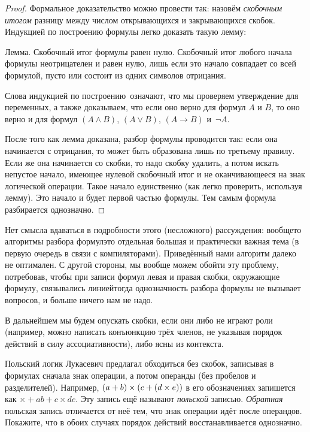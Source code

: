\begin{proof}
Формальное доказательство можно провести так: назовём
\emph{скобочным итогом}%
разницу между числом открывающихся
и закрывающихся скобок. Индукцией по построению формулы
легко доказать такую лемму:

\textsf{Лемма}. Скобочный итог формулы равен нулю.
Скобочный итог любого начала формулы неотрицателен и равен нулю,
лишь если это начало совпадает со всей формулой, пусто или
состоит из одних символов отрицания.

Слова  индукцией по построению\ означают, что мы
проверяем утверждение для переменных, а также
доказываем, что если оно верно для формул $A$ и $B$, то оно
верно и для формул $(A\land B)$, $(A\lor B)$, $(A\to B)$
и~$\lnot A$.

После того как лемма доказана, разбор формулы проводится так:
если она начинается с отрицания, то может быть образована лишь
по третьему правилу. Если же она начинается со скобки, то надо
скобку удалить, а потом искать непустое начало, имеющее нулевой
скобочный итог и не оканчивающееся на знак логической операции.
Такое начало единственно (как легко проверить, используя лемму).
Это начало и будет первой частью формулы. Тем самым формула
разбирается однозначно.
\end{proof}

Нет смысла вдаваться в подробности этого (несложного)
рассуждения: вообще\д то алгоритмы разбора формул\т это
отдельная большая и практически важная тема (в первую очередь в
связи с компиляторами). Приведённый нами алгоритм далеко не
оптимален. С другой стороны, мы вообще можем обойти эту
проблему, потребовав, чтобы при записи формул левая и правая
скобки, окружающие формулу, связывались линией\т тогда
однозначность разбора формулы не вызывает вопросов, и больше
ничего нам не надо.

В дальнейшем мы будем опускать скобки, если они либо не играют
роли (например, можно написать конъюнкцию трёх членов, не
указывая порядок действий в силу ассоциативности), либо
ясны из контекста.

\begin{problem}
Польский логик Лукасевич предлагал обходиться без скобок,
записывая в формулах сначала знак операции, а потом операнды
(без пробелов и разделителей). Например, $(a+b)\hm\times(c+(d\times
e))$ в его обозначениях запишется как ${{\times}{+}ab{+}c{\times}{d}
{e}}$. Эту запись ещё называют \emph{польской}%
записью. \emph{Обратная}
польская запись отличается от неё тем, что знак операции идёт
после операндов. Покажите, что в обоих случаях порядок действий
восстанавливается однозначно.
\end{problem}

